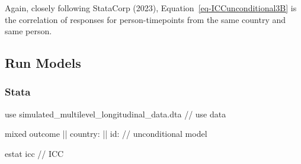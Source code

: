 \documentclass[
  letterpaper,
  DIV=11,
  numbers=noendperiod]{scrreprt}
\newenvironment{Shaded}{\begin{snugshade}}{\end{snugshade}}
\newcommand{\CommentTok}[1]{\textcolor[rgb]{0.37,0.37,0.37}{#1}}
\newcommand{\KeywordTok}[1]{\textcolor[rgb]{0.00,0.23,0.31}{#1}}
\newcommand{\NormalTok}[1]{\textcolor[rgb]{0.00,0.23,0.31}{#1}}
\begin{document}
Again, closely following StataCorp (2023),
Equation~\ref{eq-ICCunconditional3B} is the correlation of responses for
person-timepoints from the same country and same person.

\subsection{Run Models}\label{run-models-1}

\subsubsection{Stata}

\begin{Shaded}
\begin{Highlighting}[]

\KeywordTok{use}\NormalTok{ simulated\_multilevel\_longitudinal\_data.dta }\CommentTok{// use data}

\NormalTok{mixed outcome || country: || id: }\CommentTok{// unconditional model}
  
\KeywordTok{estat}\NormalTok{ icc }\CommentTok{// ICC}
\end{Highlighting}
\end{Shaded}
\end{document}
